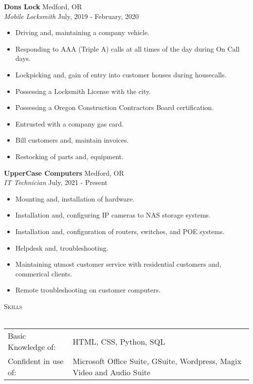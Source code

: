 \documentclass[a4paper]{article}
\newcommand{\lineunder} {
    \vspace*{-8pt} \\
    \hspace*{-18pt} \hrulefill \\
}
\newcommand{\header} [1] {
    {\hspace*{-18pt}\vspace*{6pt} \textsc{#1}}
    \vspace*{-6pt} \lineunder
}
\begin{document}
\textbf{Don\textquotesingle{}s Lock} \hfill Medford, OR\\
\textit{Mobile Locksmith} \hfill July, 2019 - February, 2020\\
\vspace{-1mm}
\begin{itemize} \itemsep 1pt
	\item Driving and, maintaining a company vehicle.
	\item Responding to AAA (Triple A) calls at all times of the day during \textquotesingle{}On Call\textquotesingle{} days.
	\item Lockpicking and, gain of entry into customer houses during housecalls.
	\item Possessing a Locksmith License with the city.
	\item Possessing a Oregon Construction Contractors Board certification.
	\item Entrusted with a company gas card.
	\item Bill customers and, maintain invoices.
	\item Restocking of parts and, equipment.
\end{itemize}
\textbf{UpperCase Computers} \hfill Medford, OR\\
\textit{IT Technician} \hfill July, 2021 - Present\\
\vspace{-1mm}
\begin{itemize} \itemsep 1pt
	\item Mounting and, installation of hardware.
	\item Installation and, configuring IP cameras to NAS storage systems.
	\item Installation and, configuration of routers, switches, and POE systems.
	\item Helpdesk and, troubleshooting.
	\item Maintaining utmost customer service with residential customers and, commerical clients.
	\item Remote troubleshooting on customer computers.
\end{itemize}

\header{Skills}
\begin{tabular}{ l l }
	Basic Knowledge of:  & HTML, CSS, Python, SQL                                                 \\
	Confident in use of: & Microsoft Office Suite, GSuite, Wordpress, Magix Video and Audio Suite \\
\end{tabular}
\vspace{2mm}





\ 
\end{document}
